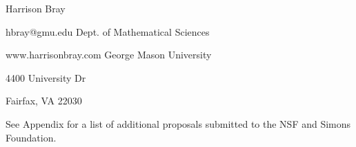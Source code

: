 \documentclass[10pt]{amsart}
\begin{document}
  { \Huge Harrison Bray \hfill \qquad} 

  \vspace{1em}

  { hbray@gmu.edu \hfill Dept. of Mathematical Sciences}

  { www.harrisonbray.com \hfill George Mason University}

  {\hfill 4400 University Dr}

  {\hfill Fairfax, VA 22030}  

  

  

  

  

  

  See Appendix for a list of additional proposals submitted to the NSF and
  Simons Foundation. 

  

  

  

  

  

  

  \newpage

  

  
\end{document}
